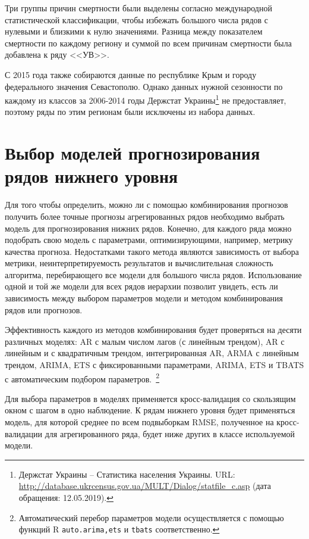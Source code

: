 \documentclass[12pt,a4paper, oneside]{extreport}
\begin{document}
Три группы причин смертности  были выделены  согласно международной статистической классификации, чтобы избежать большого числа рядов с нулевыми и близкими к нулю значениями.   Разница между показателем смертности по каждому региону и суммой по всем причинам смертности была добавлена к ряду <<УВ>>.


С 2015 года также собираются данные по республике Крым и городу федерального значения Севастополю. Однако данных нужной сезонности по каждому из классов за 2006-2014 годы Держстат Украины\footnote{Держстат Украины -- Статистика населения Украины. URL: \url{http://database.ukrcensus.gov.ua/MULT/Dialog/statfile_c.asp} (дата обращения: 12.05.2019).} не предоставляет, поэтому ряды по этим регионам были исключены из набора данных. 




\section{Выбор моделей прогнозирования рядов нижнего уровня}

Для того чтобы определить, можно ли с помощью комбинирования прогнозов получить более точные прогнозы агрегированных рядов необходимо выбрать модель для прогнозирования нижних рядов. 
Конечно,   для  каждого  ряда можно подобрать свою модель с параметрами,   оптимизирующими, например, метрику качества прогноза. Недостатками такого метода являются зависимость   от выбора метрики, неинтерпретируемость  результатов     и вычислительная сложность алгоритма, перебирающего все модели для большого числа рядов. Использование одной и той  же модели для всех  рядов иерархии    позволит  увидеть, есть ли зависимость между выбором параметров модели и методом комбинирования рядов или прогнозов.

Эффективность каждого из методов комбинирования будет проверяться на десяти различных моделях: AR с малым числом лагов (с линейным трендом), AR с линейным и с квадратичным трендом, интегрированная AR, ARMA с линейным трендом, ARIMA, 
ETS с фиксированными параметрами,  ARIMA, ETS и TBATS с автоматическим подбором параметров.~\footnote{Автоматический перебор параметров модели осуществляется с помощью функций R  \texttt{auto.arima,ets}  и \texttt{tbats} соответственно. }



Для выбора параметров в моделях применяется кросс-валидация  со скользящим окном с шагом в одно наблюдение. К рядам нижнего уровня будет применяться модель, для которой среднее по всем подвыборкам RMSE, полученное на кросс-валидации для   агрегированного ряда, будет ниже других в классе используемой модели.  
\end{document}
